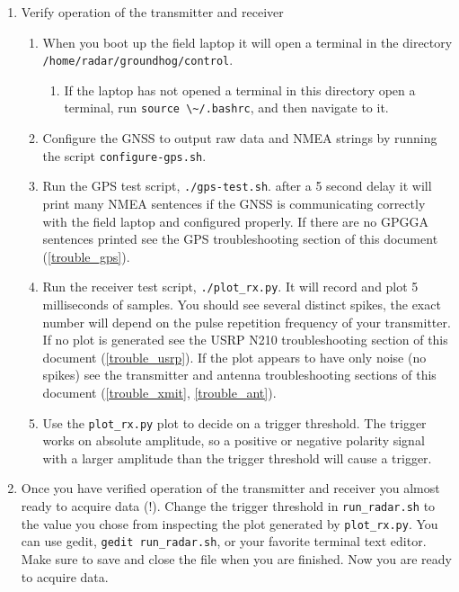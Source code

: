 \documentclass[titlepage]{article}
\begin{document}
\begin{enumerate}
    \item Verify operation of the transmitter and receiver \begin{enumerate}
        \item When you boot up the field laptop it will open a terminal in the directory \\\verb+/home/radar/groundhog/control+.
        \begin{enumerate}
            \item If the laptop has not opened a terminal in this directory open a terminal, run \verb+source \~/.bashrc+, and then navigate to it.
        \end{enumerate}
        \item Configure the GNSS to output raw data and NMEA strings by running the script \verb+configure-gps.sh+.
        \item Run the GPS test script, \verb+./gps-test.sh+. after a 5 second delay it will print many NMEA sentences if the GNSS is communicating correctly with the field laptop and configured properly. If there are no GPGGA sentences printed see the GPS troubleshooting section of this document (\ref{trouble_gps}).
        \item Run the receiver test script, \verb+./plot_rx.py+. It will record and plot 5 milliseconds of samples. You should see several distinct spikes, the exact number will depend on the pulse repetition frequency of your transmitter. If no plot is generated see the USRP N210 troubleshooting section of this document (\ref{trouble_usrp}). If the plot appears to have only noise (no spikes) see the transmitter and antenna troubleshooting sections of this document (\ref{trouble_xmit}, \ref{trouble_ant}).
        \item Use the \verb+plot_rx.py+ plot to decide on a trigger threshold. The trigger works on absolute amplitude, so a positive or negative polarity signal with a larger amplitude than the trigger threshold will cause a trigger.
    \end{enumerate}

    \item Once you have verified operation of the transmitter and receiver you almost ready to acquire data (!). Change the trigger threshold in \verb+run_radar.sh+ to the value you chose from inspecting the plot generated by \verb+plot_rx.py+. You can use gedit, \verb+gedit run_radar.sh+, or your favorite terminal text editor. Make sure to save and close the file when you are finished. Now you are ready to acquire data.
\end{enumerate}
\end{document}
